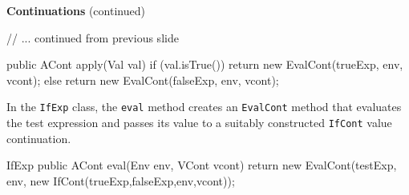 \begin{minipage}[t]{\sw}
\slidenumber
\LARGE
{\bf Continuations} (continued)
\Large
\begin{qv}
// ... continued from previous slide

    public ACont apply(Val val) {
        if (val.isTrue())
            return new EvalCont(trueExp, env, vcont);
        else
            return new EvalCont(falseExp, env, vcont);
    }
\end{qv}
\LARGE
In the \verb'IfExp' class, the \verb'eval' method
creates an \verb'EvalCont' method that evaluates
the test expression and passes its value
to a suitably constructed \verb'IfCont' value continuation.
\Large
\begin{qv}
IfExp
    public ACont eval(Env env, VCont vcont) {
        return new EvalCont(testExp,
                            env,
                            new IfCont(trueExp,falseExp,env,vcont));
    }
\end{qv}
\end{minipage}
